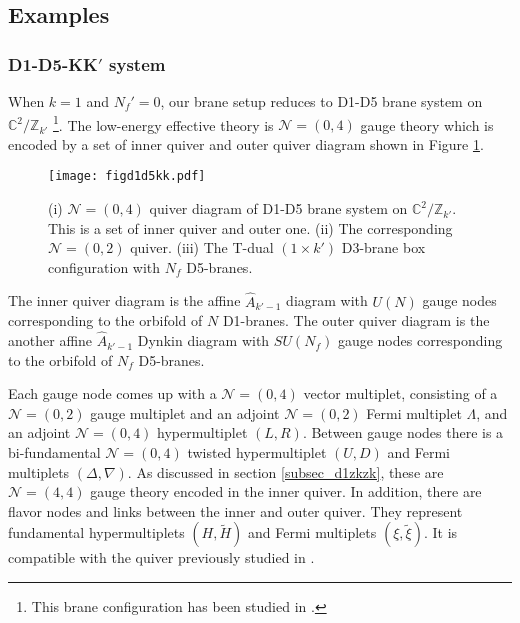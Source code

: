 \documentclass{article}
\numberwithin{equation}{section}
\begin{document}
\subsection{Examples}
\label{sec_d1d5kk_eg}



\subsubsection{D1-D5-KK$'$ system}
\label{sec_d1d5kk'_eg}
When $k=1$ and $N_{f}'=0$, our brane setup reduces to D1-D5 brane system on $\mathbb{C}^{2}/\mathbb{Z}_{k'}$ 
\footnote{
This brane configuration has been studied in 
\cite{Sugawara:1999qp, Behrndt:1998nt, Kutasov:1998zh, Berenstein:1998rr, Sugawara:1999qp, Bena:2005ay}.}. 
The low-energy effective theory is $\mathcal{N}=(0,4)$ gauge theory which 
is encoded by a set of inner quiver  and outer quiver diagram shown in Figure \ref{figd1d5kk}. 
\begin{figure}
\begin{center}
\texttt{[image: figd1d5kk.pdf]}
\caption{
(i) $\mathcal{N}=(0,4)$ quiver diagram of D1-D5 brane system on $\mathbb{C}^{2}/\mathbb{Z}_{k'}$. 
This is a set of inner quiver and outer one. 
(ii) The corresponding $\mathcal{N}=(0,2)$ quiver. 
(iii) The T-dual $(1\times k')$ D3-brane box configuration with $N_{f}$ D5-branes. }
\label{figd1d5kk}
\end{center}
\end{figure}
The inner quiver diagram is the affine $\widehat{A}_{k'-1}$ diagram 
with $U(N)$ gauge nodes corresponding to the orbifold of $N$ D1-branes. 
The outer quiver diagram is the another affine $\widehat{A}_{k'-1}$ Dynkin diagram 
with $SU(N_{f})$ gauge nodes corresponding to the orbifold of $N_{f}$ D5-branes. 


Each gauge node comes up with 
a $\mathcal{N}=(0,4)$ vector multiplet, consisting of a $\mathcal{N}=(0,2)$ gauge multiplet 
and an adjoint $\mathcal{N}=(0,2)$ Fermi multiplet $\Lambda$,  
and an adjoint $\mathcal{N}=(0,4)$ hypermultiplet $(L, R)$. 
Between gauge nodes there is a bi-fundamental $\mathcal{N}=(0,4)$ twisted hypermultiplet $(U, D)$ 
and Fermi multiplets $(\Delta, \nabla)$. 
As discussed in section \ref{subsec_d1zkzk}, 
these are $\mathcal{N}=(4,4)$ gauge theory encoded in the inner quiver. 
In addition, there are flavor nodes and links between the inner and outer quiver. 
They represent fundamental hypermultiplets $(H,\widetilde{H})$ 
and Fermi multiplets $(\xi,\widetilde{\xi})$. 
It is compatible with the quiver previously studied in \cite{Okuyama:2005gq, Haghighat:2013tka, Gadde:2015tra}. 
\end{document}
